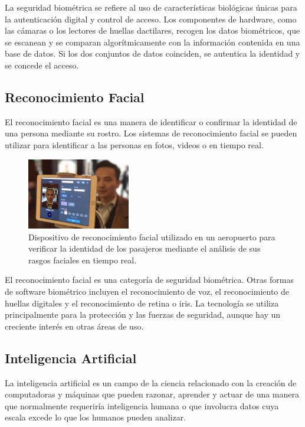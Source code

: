 \documentclass[10pt,a4paper]{article}
\begin{document}
\begin{multicols}{2}
La seguridad biométrica se refiere al uso de características biológicas únicas para la autenticación digital y control de acceso. Los componentes de
hardware, como las cámaras o los lectores de huellas dactilares, recogen los
datos biométricos, que se escanean y se comparan algorítmicamente con la
información contenida en una base de datos. Si los dos conjuntos de datos
coinciden, se autentica la identidad y se concede el acceso\cite{thalesBiometria}.

\subsection{Reconocimiento Facial}

El reconocimiento facial es una manera de identificar o confirmar la identidad de una persona mediante su rostro. Los sistemas de reconocimiento facial
se pueden utilizar para identificar a las personas en fotos, videos o en tiempo
real\cite{reconocimientoKaspersky}.

\begin{figure}[H]
  \centering
  \includegraphics[width=0.4\textwidth]{imagenes_doc/Reconocimiento_Facial.jpg}
  \caption{Dispositivo de reconocimiento facial utilizado en un aeropuerto para verificar la identidad de los pasajeros mediante el análisis de sus rasgos faciales en tiempo real\cite{aeropuertosJapon}.}
  \label{fig:logo}
\end{figure}

El reconocimiento facial es una categoría de seguridad biométrica. Otras
formas de software biométrico incluyen el reconocimiento de voz, el reconocimiento de huellas digitales y el reconocimiento de retina o iris. La tecnología
se utiliza principalmente para la protección y las fuerzas de seguridad, aunque
hay un creciente interés en otras áreas de uso\cite{reconocimientoKaspersky}.

\subsection{Inteligencia Artificial}
La inteligencia artificial es un campo de la ciencia relacionado con la creación de computadoras y máquinas que pueden razonar, aprender y actuar de una manera que normalmente requeriría inteligencia humana o que involucra datos cuya escala excede lo que los humanos pueden analizar.


\end{multicols}
\end{document}
